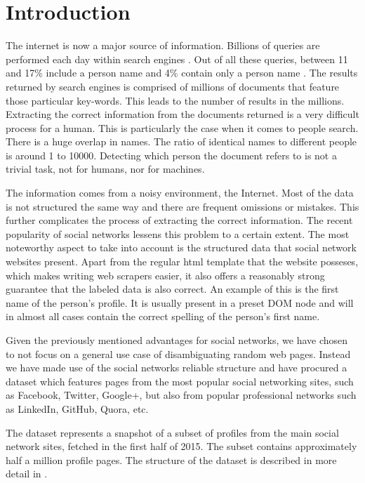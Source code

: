 \chapter{Introduction}
\label{chapter:intro}

The internet is now a major source of information. Billions of queries are performed
each day within search engines \cite{search-stats}. Out of all these queries, between 11 and 17\%
include a person name and 4\% contain only a person name \cite{weps3-eval}\cite{weps2-eval}.
The results returned by search engines is comprised of millions of documents 
that feature those particular key-words. This leads to the number of results 
in the millions. Extracting the correct information from the documents returned 
is a very difficult process for a human. This is particularly the case when it 
comes to people search. There is a huge overlap in names. The ratio of identical 
names to different people is around 1 to 10000. Detecting which person the document 
refers to is not a trivial task, not for humans, nor for machines.

The information comes from a noisy environment, the Internet. Most of the data
is not structured the same way and there are frequent omissions or mistakes.
This further complicates the process of extracting the correct information.
The recent popularity of social networks lessens this problem to a certain
extent. \cite{social-networks} The most noteworthy aspect to take into account is 
the structured data that social network websites present. \cite{social-networks-scraping}
Apart from the regular html template that the website posseses, which makes writing
web scrapers easier, it also offers a reasonably strong guarantee that the labeled
data is also correct. An example of this is the first name of the person's profile.
It is usually present in a preset DOM node and will in almost all cases contain
the correct spelling of the person's first name.

Given the previously mentioned advantages for social networks, we have chosen
to not focus on a general use case of disambiguating random web pages. Instead
we have made use of the social networks reliable structure and have procured
a dataset which features pages from the most popular social networking sites,
such as Facebook, Twitter, Google+, but also from popular professional networks
such as LinkedIn, GitHub, Quora, etc.

The dataset represents a snapshot of a subset of profiles from the main
social network sites, fetched in the first half of 2015. The subset contains
approximately half a million profile pages. The structure of the dataset
is described in more detail in .

